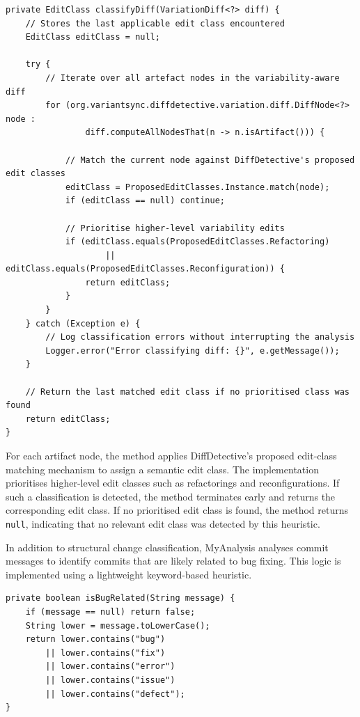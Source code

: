\begin{lstlisting}[style=mypicturestyle, caption={Classification of variability-aware edits in \texttt{MyAnalysis}}, label={lst:classify}]
private EditClass classifyDiff(VariationDiff<?> diff) {
    // Stores the last applicable edit class encountered
    EditClass editClass = null;

    try {
        // Iterate over all artefact nodes in the variability-aware diff
        for (org.variantsync.diffdetective.variation.diff.DiffNode<?> node :
                diff.computeAllNodesThat(n -> n.isArtifact())) {

            // Match the current node against DiffDetective's proposed edit classes
            editClass = ProposedEditClasses.Instance.match(node);
            if (editClass == null) continue;

            // Prioritise higher-level variability edits
            if (editClass.equals(ProposedEditClasses.Refactoring)
                    || editClass.equals(ProposedEditClasses.Reconfiguration)) {
                return editClass;
            }
        }
    } catch (Exception e) {
        // Log classification errors without interrupting the analysis
        Logger.error("Error classifying diff: {}", e.getMessage());
    }

    // Return the last matched edit class if no prioritised class was found
    return editClass;
}
\end{lstlisting}


For each artifact node, the method applies DiffDetective’s proposed edit-class matching mechanism to assign a semantic edit class. The implementation prioritises higher-level edit classes such as refactorings and reconfigurations. If such a classification is detected, the method terminates early and returns the corresponding edit class. If no prioritised edit class is found, the method returns \texttt{null}, indicating that no relevant edit class was detected by this heuristic.

In addition to structural change classification, MyAnalysis analyses commit messages to identify commits that are likely related to bug fixing. This logic is implemented using a lightweight keyword-based heuristic.

\begin{lstlisting}[style=mypicturestyle, caption={Heuristic for detecting bug-related commits}, label={lst:bug}]
private boolean isBugRelated(String message) {
    if (message == null) return false;
    String lower = message.toLowerCase();
    return lower.contains("bug")
        || lower.contains("fix")
        || lower.contains("error")
        || lower.contains("issue")
        || lower.contains("defect");
}
\end{lstlisting}

